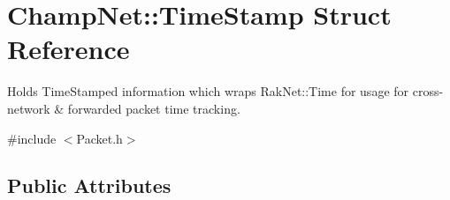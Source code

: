 \hypertarget{struct_champ_net_1_1_time_stamp}{\section{Champ\-Net\-:\-:Time\-Stamp Struct Reference}
\label{struct_champ_net_1_1_time_stamp}
}


Holds Time\-Stamped information which wraps Rak\-Net\-::\-Time for usage for cross-\/network \& forwarded packet time tracking.  




{\ttfamily \#include $<$Packet.\-h$>$}

\subsection*{Public Attributes}
